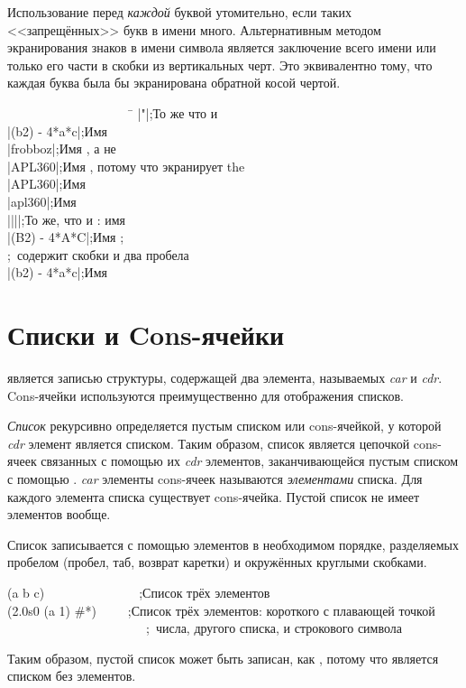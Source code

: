 Использование \cd{{\Xbackslash}} перед \emph{каждой} буквой утомительно, если
таких <<запрещённых>> букв в имени много. Альтернативным методом экранирования
знаков в имени символа является заключение всего имени или только его части в
скобки из вертикальных черт. Это эквивалентно тому, что каждая буква была бы
экранирована обратной косой чертой.
\begin{lisp}
~~~~~~~~~~~~~~~~~~~~\=\kill
|"|\>;\textrm{То же что и } \\
|(b{\Xcircumflex}2) - 4*a*c|\>;\textrm{Имя } \\
|frobboz|\>;\textrm{Имя , а не } \\
|APL{\Xbackslash}360|\>;\textrm{Имя , потому что \cd{{\Xbackslash}} экранирует the } \\
|APL{\Xbackslash}{\Xbackslash}360|\>;\textrm{Имя } \\
|apl{\Xbackslash}{\Xbackslash}360|\>;\textrm{Имя } \\
|{\Xbackslash}|{\Xbackslash}||\>;\textrm{То же, что и \cd{{\Xbackslash}|{\Xbackslash}|}: имя \cd{||}} \\
|(B{\Xcircumflex}2) - 4*A*C|\>;\textrm{Имя ;} \\
\>;~\textrm{содержит скобки и два пробела} \\
|(b{\Xcircumflex}2) - 4*a*c|\>;\textrm{Имя }
\end{lisp}

\section{Списки и Cons-ячейки}

 является записью структуры, содержащей два элемента, называемых
\emph{car} и \emph{cdr}. Cons-ячейки используются преимущественно для отображения
списков.

\emph{Список} рекурсивно определяется пустым списком или cons-ячейкой, у
которой \emph{cdr} элемент является списком.
Таким образом, список является цепочкой cons-ячеек связанных с помощью их {\it
  cdr} элементов, заканчивающейся пустым списком с помощью {\nil}. \emph{car}
элементы cons-ячеек называются \emph{элементами} списка. Для каждого элемента
списка существует cons-ячейка. Пустой список не имеет элементов вообще.

Список записывается с помощью элементов в необходимом порядке, разделяемых
пробелом (пробел, таб, возврат каретки) и окружённых круглыми скобками.
\begin{lisp}
(a b c)~~~~~~~~~~~~~~~;\textrm{Список трёх элементов} \\
(2.0s0 (a 1) \#{\Xbackslash}*)~~~~~;\textrm{Список трёх элементов: короткого с
  плавающей точкой} \\
~~~~~~~~~~~~~~~~~~~~~~;~\textrm{числа, другого списка, и строкового символа}
\end{lisp}
Таким образом, пустой список {\nil} может быть записан, как {\emptylist}, потому что
является списком без элементов.

